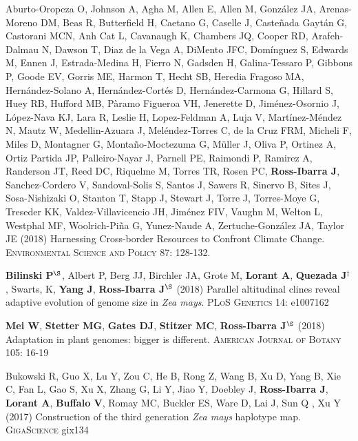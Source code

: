 \documentclass[letterpaper,10pt]{article}
\begin{document}
\begin{etaremune}
\item  Aburto-Oropeza O, Johnson A, Agha M, Allen E,  Allen M,  Gonz\'{a}lez JA, Arenas-Moreno DM, Beas R, Butterfield H, Caetano G, Caselle J, Caste\~{n}ada Gayt\'{a}n G, Castorani MCN, Anh Cat L, Cavanaugh K, Chambers JQ, Cooper RD, Arafeh-Dalmau N, Dawson T, Diaz de la Vega A, DiMento JFC, Dom\'{i}nguez S, Edwards M, Ennen J, Estrada-Medina H, Fierro N, Gadsden H, Galina-Tessaro P, Gibbons P, Goode EV, Gorris ME, Harmon T, Hecht SB, Heredia Fragoso MA, Hern\'{a}ndez-Solano A, Hern\'{a}ndez-Cort\'{e}s D, Hern\'{a}ndez-Carmona G, Hillard S, Huey RB, Hufford MB, P\`{a}ramo Figueroa VH, Jenerette D, Jim\'{e}nez-Osornio J, L\'{o}pez-Nava KJ, Lara R, Leslie H, Lopez-Feldman A, Luja V, Mart\'{i}nez-M\'{e}ndez N, Mautz W, Medellin-Azuara J, Mel\'{e}ndez-Torres C, de la Cruz FRM,  Micheli F, Miles D, Montagner G, Monta\~{n}o-Moctezuma G, M\"{u}ller J, Oliva P, Ortinez A, Ortiz Partida JP, Palleiro-Nayar J, Parnell PE, Raimondi P, Ramirez A, Randerson JT, Reed DC, Riquelme M, Torres TR, Rosen PC, {\bf Ross-Ibarra J}, Sanchez-Cordero V, Sandoval-Solis S, Santos J, Sawers R, Sinervo B, Sites J,  Sosa-Nishizaki O, Stanton T, Stapp J, Stewart J, Torre J,  Torres-Moye G, Treseder KK, Valdez-Villavicencio JH, Jim\'{e}nez FIV, Vaughn M, Welton L, Westphal MF, Woolrich-Pi\~{n}a G,  Yunez-Naude A, Zertuche-Gonz\'{a}lez JA, Taylor JE (2018)
Harnessing Cross-border Resources to Confront Climate Change.  \textsc{Environmental Science and Policy}  87: 128-132.

\item \textbf{Bilinski P}$^\S$, Albert P, Berg JJ, Birchler JA, Grote M, \textbf{Lorant A}, \textbf{Quezada J}$^\ddagger$, Swarts, K, \textbf{Yang J}, \textbf{Ross-Ibarra J}$^\S$ (2018) Parallel altitudinal clines reveal adaptive evolution of genome size in \textit{Zea mays}. \textsc{PLoS Genetics} 14: e1007162

\item {\bf Mei W}, {\bf Stetter MG}, {\bf Gates DJ}, {\bf Stitzer MC}, {\bf Ross-Ibarra J}$^\S$ (2018) Adaptation in plant genomes: bigger is different.  \textsc{American Journal of Botany} 105: 16-19

\item Bukowski R, Guo X, Lu Y, Zou C, He B, Rong Z, Wang B,  Xu D,  Yang B, Xie C,  Fan L, Gao S, Xu X, Zhang G, Li Y, Jiao Y, Doebley J, {\bf Ross-Ibarra J}, {\bf Lorant A}, {\bf Buffalo V}, Romay MC, Buckler ES, Ware D, Lai J, Sun Q , Xu Y (2017) Construction of the third generation \emph{Zea mays} haplotype map. \textsc{GigaScience} gix134


\end{etaremune}
\end{document}
